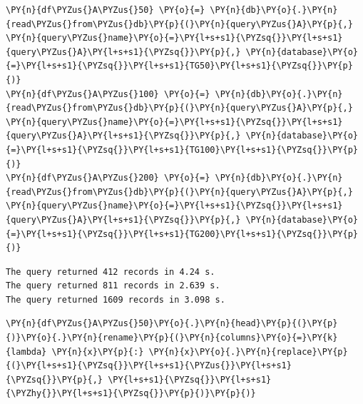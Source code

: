     \begin{tcolorbox}[breakable, size=fbox, boxrule=1pt, pad at break*=1mm,colback=cellbackground, colframe=cellborder]
\begin{Verbatim}[commandchars=\\\{\}]
\PY{n}{df\PYZus{}A\PYZus{}50} \PY{o}{=} \PY{n}{db}\PY{o}{.}\PY{n}{read\PYZus{}from\PYZus{}db}\PY{p}{(}\PY{n}{query\PYZus{}A}\PY{p}{,} \PY{n}{query\PYZus{}name}\PY{o}{=}\PY{l+s+s1}{\PYZsq{}}\PY{l+s+s1}{query\PYZus{}A}\PY{l+s+s1}{\PYZsq{}}\PY{p}{,} \PY{n}{database}\PY{o}{=}\PY{l+s+s1}{\PYZsq{}}\PY{l+s+s1}{TG50}\PY{l+s+s1}{\PYZsq{}}\PY{p}{)}
\PY{n}{df\PYZus{}A\PYZus{}100} \PY{o}{=} \PY{n}{db}\PY{o}{.}\PY{n}{read\PYZus{}from\PYZus{}db}\PY{p}{(}\PY{n}{query\PYZus{}A}\PY{p}{,} \PY{n}{query\PYZus{}name}\PY{o}{=}\PY{l+s+s1}{\PYZsq{}}\PY{l+s+s1}{query\PYZus{}A}\PY{l+s+s1}{\PYZsq{}}\PY{p}{,} \PY{n}{database}\PY{o}{=}\PY{l+s+s1}{\PYZsq{}}\PY{l+s+s1}{TG100}\PY{l+s+s1}{\PYZsq{}}\PY{p}{)}
\PY{n}{df\PYZus{}A\PYZus{}200} \PY{o}{=} \PY{n}{db}\PY{o}{.}\PY{n}{read\PYZus{}from\PYZus{}db}\PY{p}{(}\PY{n}{query\PYZus{}A}\PY{p}{,} \PY{n}{query\PYZus{}name}\PY{o}{=}\PY{l+s+s1}{\PYZsq{}}\PY{l+s+s1}{query\PYZus{}A}\PY{l+s+s1}{\PYZsq{}}\PY{p}{,} \PY{n}{database}\PY{o}{=}\PY{l+s+s1}{\PYZsq{}}\PY{l+s+s1}{TG200}\PY{l+s+s1}{\PYZsq{}}\PY{p}{)}
\end{Verbatim}
\end{tcolorbox}

    \begin{Verbatim}[commandchars=\\\{\}]
The query returned 412 records in 4.24 s.
The query returned 811 records in 2.639 s.
The query returned 1609 records in 3.098 s.
    \end{Verbatim}

    \begin{tcolorbox}[breakable, size=fbox, boxrule=1pt, pad at break*=1mm,colback=cellbackground, colframe=cellborder]
\begin{Verbatim}[commandchars=\\\{\}]
\PY{n}{df\PYZus{}A\PYZus{}50}\PY{o}{.}\PY{n}{head}\PY{p}{(}\PY{p}{)}\PY{o}{.}\PY{n}{rename}\PY{p}{(}\PY{n}{columns}\PY{o}{=}\PY{k}{lambda} \PY{n}{x}\PY{p}{:} \PY{n}{x}\PY{o}{.}\PY{n}{replace}\PY{p}{(}\PY{l+s+s1}{\PYZsq{}}\PY{l+s+s1}{\PYZus{}}\PY{l+s+s1}{\PYZsq{}}\PY{p}{,} \PY{l+s+s1}{\PYZsq{}}\PY{l+s+s1}{\PYZhy{}}\PY{l+s+s1}{\PYZsq{}}\PY{p}{)}\PY{p}{)}
\end{Verbatim}
\end{tcolorbox}
 
